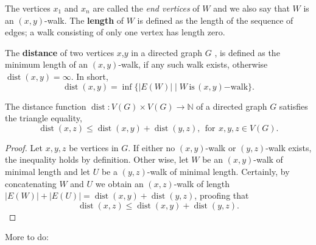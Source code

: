 The vertices $x_1$ and $x_n$ are called the \textit{end vertices} of
$W$ and we also say that $W$ is an $(x,y)$-walk. The \textbf{length}
of $W$ is defined as the length of the sequence of edges; a walk
consisting of only one vertex has length zero. 


\begin{defn}[Distance]
  The \textbf{distance} of two vertices $x$,$y$ in a directed graph
  $G$ , is defined as the minimum length of an
  $(x,y)$-walk, if any such walk exists, otherwise
  $\operatorname{dist}(x,y)=\infty$. In short,
  \[
  \operatorname{dist}(x,y) = \inf \{|E(W)| \mid
  W\,\mathrm{is}\,(x,y)\mathrm{-walk}\}.
  \]
\end{defn}

\begin{proposition}
  The distance function $\operatorname{dist}: V(G) \times V(G) \to
  \mathbb{N}$ of a directed graph $G$ satisfies the triangle equality,
  \[
  \operatorname{dist}(x,z) \le \operatorname{dist}(x,y) +
  \operatorname{dist}(y,z), \:\: \mathrm{for}\:\, x,y,z \in V(G).
  \]
\end{proposition}

\begin{proof}
  Let $x,y,z$ be vertices in $G$. If either no $(x,y)$-walk or
  $(y,z)$-walk exists, the inequality holds by definition. Other wise,
  let $W$ be an $(x,y)$-walk of minimal length and let $U$ be a
  $(y,z)$-walk of minimal length. Certainly, by concatenating $W$ and
  $U$ we obtain an $(x,z)$-walk of length $|E(W)| + |E(U)| =
  \operatorname{dist}(x,y) + \operatorname{dist}(y,z)$, proofing
  that \[ \operatorname{dist}(x,z) \le \operatorname{dist}(x,y) +
  \operatorname{dist}(y,z).
  \]
\end{proof}

More to do:

